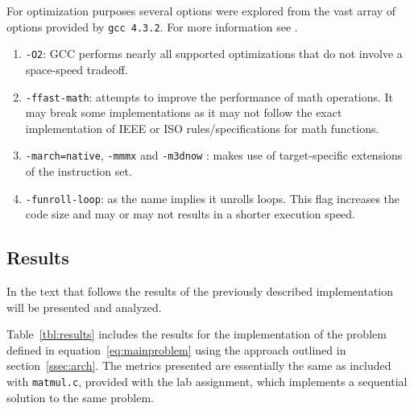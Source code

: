 For optimization purposes several options were explored from the vast array of options provided by \texttt{gcc 4.3.2}. For more information see \cite{gcc}.

\begin{enumerate}
\item \texttt{-O2}: GCC performs nearly all supported optimizations that do not involve a space-speed tradeoff.
\item \texttt{-ffast-math}: attempts to improve the performance of math operations. It may break some implementations as it may not follow the exact implementation of IEEE or ISO rules/specifications for math functions.
\item \texttt{-march=native}, \texttt{-mmmx} and  \texttt{-m3dnow} : makes use of target-specific extensions of the instruction set.
\item \texttt{-funroll-loop}: as the name implies it unrolls loops. This flag increases the code size and may or may not results in a shorter execution speed.
\end{enumerate}

\subsection{Results}
\label{ssec:results}

In the text that follows the results of the previously described implementation will be presented and analyzed.

Table~\ref{tbl:results} includes the results for the implementation of the problem defined in equation~\ref{eq:mainproblem} using the approach outlined in section~\ref{ssec:arch}.
The metrics presented are essentially the same as included with \texttt{matmul.c}, provided with the lab assignment, which implements a sequential solution to the same problem.

